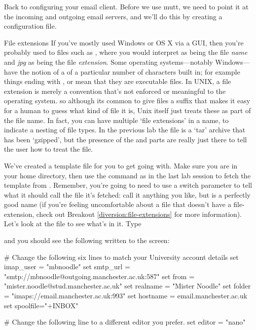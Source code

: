 Back to configuring your email client. Before we use mutt, we need to point it at the incoming and outgoing email servers, and we'll do this by creating a configuration file.

\begin{diversion}{File extensions}
\label{diversion:file-extensions}
If you've mostly used Windows or OS X via a GUI, then you're probably used to files such as , where you would interpret  as being the file \textit{name} and \textit{jpg} as being the file \textit{extension}. Some operating systems---notably Windows---have the notion of a  of a particular number of characters built in; for example things ending with ,  or  mean that they are executable files. In UNIX, a file extension is merely a convention that's not enforced or meaningful to the operating system. so although its common to give files a suffix that makes it easy for a human to guess what kind of file it is, Unix itself just treats these as part of the file name. In fact, you can have multiple `file extensions' in a name, to indicate a nesting of file types. In the previous lab the file  is a `tar' archive that has been `gzipped', but the presence of the  and  parts are really just there to tell the user how to treat the file.
\end{diversion}

We've created a template file for you to get going with. Make sure you are in your home directory, then use the  command as in the last lab session to fetch the template from . Remember, you're going to need to use a switch parameter to tell  what it should call the file it's fetched: call it anything you like, but  is a perfectly good name (if you're feeling uncomfortable about a file that doesn't have a file-extension, check out Breakout \ref{diversion:file-extensions} for more information). Let's look at the file to see what's in it. Type


and you should see the following written to the screen:
\begin{ttoutenv}
# Change the following six lines to match your University account details
set imap_user = "mbnoodle"
set smtp_url = "smtp://mbnoodle@outgoing.manchester.ac.uk:587"
set from = "mister.noodle@stud.manchester.ac.uk"
set realname = "Mister Noodle"
set folder = "imaps://email.manchester.ac.uk:993"
set hostname = email.manchester.ac.uk
set spoolfile="+INBOX"

# Change the following line to a different editor you prefer.
set editor = "nano"
\end{ttoutenv}

